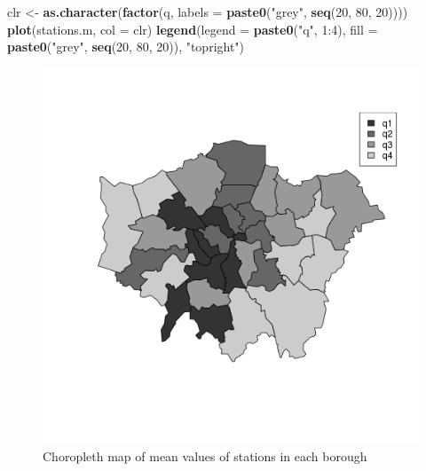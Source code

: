 \documentclass[]{article}
\newenvironment{Shaded}{}{}
\newcommand{\KeywordTok}[1]{\textcolor[rgb]{0.00,0.44,0.13}{\textbf{{#1}}}}
\newcommand{\DataTypeTok}[1]{\textcolor[rgb]{0.56,0.13,0.00}{{#1}}}
\newcommand{\DecValTok}[1]{\textcolor[rgb]{0.25,0.63,0.44}{{#1}}}
\newcommand{\StringTok}[1]{\textcolor[rgb]{0.25,0.44,0.63}{{#1}}}
\newcommand{\NormalTok}[1]{{#1}}
\begin{document}
\begin{Shaded}
\begin{Highlighting}[]
\NormalTok{clr <-}\StringTok{ }\KeywordTok{as.character}\NormalTok{(}\KeywordTok{factor}\NormalTok{(q, }\DataTypeTok{labels =} \KeywordTok{paste0}\NormalTok{(}\StringTok{"grey"}\NormalTok{, }\KeywordTok{seq}\NormalTok{(}\DecValTok{20}\NormalTok{, }\DecValTok{80}\NormalTok{, }\DecValTok{20}\NormalTok{))))}
\KeywordTok{plot}\NormalTok{(stations.m, }\DataTypeTok{col =} \NormalTok{clr)}
\KeywordTok{legend}\NormalTok{(}\DataTypeTok{legend =} \KeywordTok{paste0}\NormalTok{(}\StringTok{"q"}\NormalTok{, }\DecValTok{1}\NormalTok{:}\DecValTok{4}\NormalTok{), }\DataTypeTok{fill =} \KeywordTok{paste0}\NormalTok{(}\StringTok{"grey"}\NormalTok{, }\KeywordTok{seq}\NormalTok{(}\DecValTok{20}\NormalTok{, }\DecValTok{80}\NormalTok{, }\DecValTok{20}\NormalTok{)), }\StringTok{"topright"}\NormalTok{)}
\end{Highlighting}
\end{Shaded}

\begin{figure}[htbp]
\centering
\includegraphics{figure/Choropleth_map_of_mean_values_of_stations_in_each_borough.png}
\caption{Choropleth map of mean values of stations in each
borough}
\end{figure}
\end{document}
